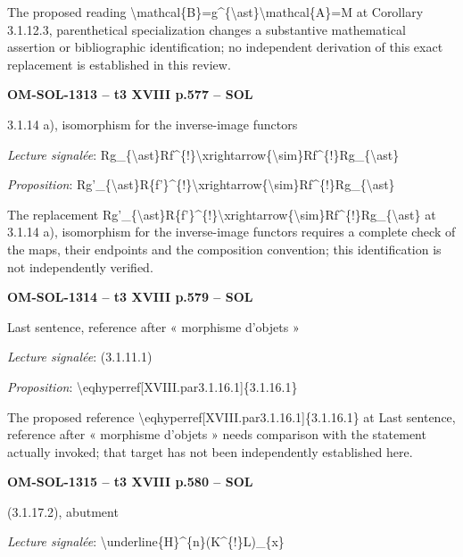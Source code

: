 The proposed reading \textbackslash{}mathcal\{B\}=\allowbreak g\textasciicircum{}\{\textbackslash{}ast\}\textbackslash{}mathcal\{A\}=\allowbreak M at Corollary 3.1.12.3, parenthetical specialization changes a substantive mathematical assertion or bibliographic identification; no independent derivation of this exact replacement is established in this review.\par
\par\noindent\textbf{OM-SOL-1313 -- t3 XVIII p.577 -- SOL}\par
3.1.14 a), isomorphism for the inverse-image functors\par
\emph{Lecture signalée}: Rg\_\{\textbackslash{}ast\}Rf\textasciicircum{}\{!\}\textbackslash{}xrightarrow\{\textbackslash{}sim\}Rf\textasciicircum{}\{!\}Rg\_\{\textbackslash{}ast\}\par
\emph{Proposition}: Rg'\_\{\textbackslash{}ast\}R\{f'\}\textasciicircum{}\{!\}\textbackslash{}xrightarrow\{\textbackslash{}sim\}Rf\textasciicircum{}\{!\}Rg\_\{\textbackslash{}ast\}\par
The replacement Rg'\_\{\textbackslash{}ast\}R\{f'\}\textasciicircum{}\{!\}\textbackslash{}xrightarrow\{\textbackslash{}sim\}Rf\textasciicircum{}\{!\}Rg\_\{\textbackslash{}ast\} at 3.1.14 a), isomorphism for the inverse-image functors requires a complete check of the maps, their endpoints and the composition convention; this identification is not independently verified.\par
\par\noindent\textbf{OM-SOL-1314 -- t3 XVIII p.579 -- SOL}\par
Last sentence, reference after « morphisme d'objets »\par
\emph{Lecture signalée}: (3.1.11.1)\par
\emph{Proposition}: \textbackslash{}eqhyperref[XVIII.par3.1.16.1]\{3.1.16.1\}\par
The proposed reference \textbackslash{}eqhyperref[XVIII.par3.1.16.1]\{3.1.16.1\} at Last sentence, reference after « morphisme d'objets » needs comparison with the statement actually invoked; that target has not been independently established here.\par
\par\noindent\textbf{OM-SOL-1315 -- t3 XVIII p.580 -- SOL}\par
(3.1.17.2), abutment\par
\emph{Lecture signalée}: \textbackslash{}underline\{H\}\textasciicircum{}\{n\}(K\textasciicircum{}\{!\}L)\_\{x\}\par
